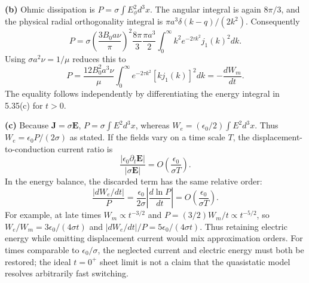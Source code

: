 \textbf{(b)} Ohmic dissipation is $P=\sigma\int E_\phi^2d^3x$.
The angular integral is again $8\pi/3$, and the physical radial
orthogonality integral is $\pi a^3\delta(k-q)/(2k^2)$.
Consequently
\[
P=\sigma\left(\frac{3B_0a\nu}{\pi}\right)^2
\frac{8\pi}{3}\frac{\pi a^3}{2}
\int_0^\infty k^2e^{-2\tau k^2}j_1(k)^2dk.
\]
Using $\sigma a^2\nu=1/\mu$ reduces this to
\[
\boxed{P=\frac{12B_0^2a^3\nu}{\mu}
\int_0^\infty e^{-2\tau k^2}[kj_1(k)]^2dk
=-\frac{dW_m}{dt}.}
\]
The equality follows independently by differentiating the energy
integral in 5.35(c) for $t>0$.

\textbf{(c)} Because $\mathbf J=\sigma\mathbf E$,
$P=\sigma\int E^2d^3x$, whereas
$W_e=(\epsilon_0/2)\int E^2d^3x$.
Thus $W_e=\epsilon_0P/(2\sigma)$ as stated.
If the fields vary on a time scale $T$, the displacement-to-conduction
current ratio is
\[
\frac{|\epsilon_0\partial_t\mathbf E|}{|\sigma\mathbf E|}
=O\left(\frac{\epsilon_0}{\sigma T}\right).
\]
In the energy balance, the discarded term has the same relative order:
\[
\frac{|dW_e/dt|}{P}
=\frac{\epsilon_0}{2\sigma}\left|\frac{d\ln P}{dt}\right|
=O\left(\frac{\epsilon_0}{\sigma T}\right).
\]
For example, at late times $W_m\propto t^{-3/2}$ and
$P=(3/2)W_m/t\propto t^{-5/2}$, so
$W_e/W_m=3\epsilon_0/(4\sigma t)$ and
$|dW_e/dt|/P=5\epsilon_0/(4\sigma t)$.
Thus retaining electric energy while omitting displacement current
would mix approximation orders. For times comparable to
$\epsilon_0/\sigma$, the neglected current and electric energy must
both be restored; the ideal $t=0^+$ sheet limit is not a claim that
the quasistatic model resolves arbitrarily fast switching.
